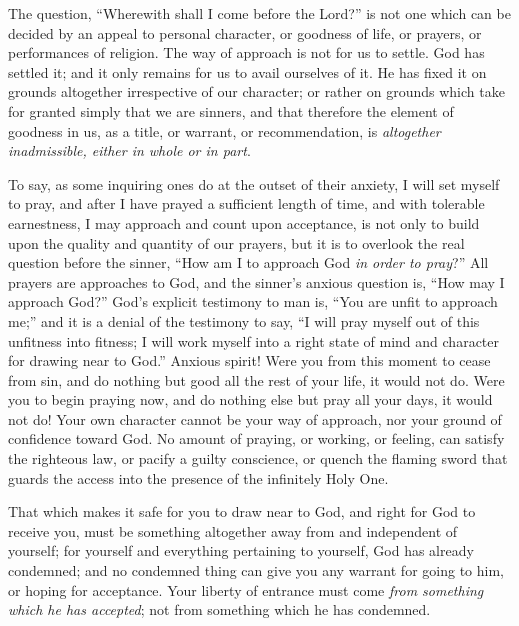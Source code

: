 \documentclass[
]{book}
\begin{document}
The question, ``Wherewith shall I come before the Lord?'' is not one which can be decided by an appeal to personal character, or goodness of life, or prayers, or performances of religion. The way of approach is not for us to settle. God has settled it; and it only remains for us to avail ourselves of it. He has fixed it on grounds altogether irrespective of our character; or rather on grounds which take for granted simply that we are sinners, and that therefore the element of goodness in us, as a title, or warrant, or recommendation, is \emph{altogether inadmissible, either in whole or in part}.

To say, as some inquiring ones do at the outset of their anxiety, I will set myself to pray, and after I have prayed a sufficient length of time, and with tolerable earnestness, I may approach and count upon acceptance, is not only to build upon the quality and quantity of our prayers, but it is to overlook the real question before the sinner, ``How am I to approach God \emph{in order to pray}?'' All prayers are approaches to God, and the sinner's anxious question is, ``How may I approach God?'' God's explicit testimony to man is, ``You are unfit to approach me;'' and it is a denial of the testimony to say, ``I will pray myself out of this unfitness into fitness; I will work myself into a right state of mind and character for drawing near to God.'' Anxious spirit! Were you from this moment to cease from sin, and do nothing but good all the rest of your life, it would not do. Were you to begin praying now, and do nothing else but pray all your days, it would not do! Your own character cannot be your way of approach, nor your ground of confidence toward God. No amount of praying, or working, or feeling, can satisfy the righteous law, or pacify a guilty conscience, or quench the flaming sword that guards the access into the presence of the infinitely Holy One.

That which makes it safe for you to draw near to God, and right for God to receive you, must be something altogether away from and independent of yourself; for yourself and everything pertaining to yourself, God has already condemned; and no condemned thing can give you any warrant for going to him, or hoping for acceptance. Your liberty of entrance must come \emph{from something which he has accepted}; not from something which he has condemned.
\end{document}
